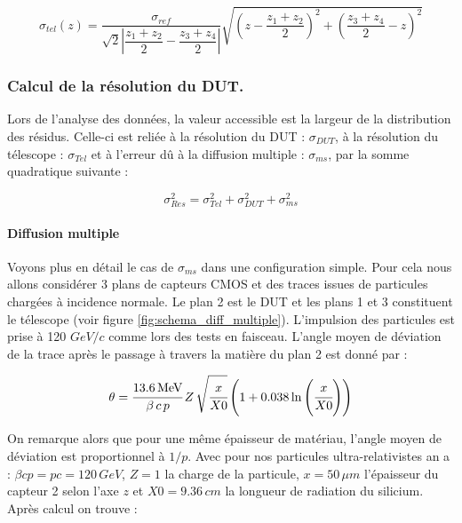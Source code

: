   \begin{equation}
   \sigma_{tel}(z) = \dfrac{\sigma_{ref} }{ \sqrt{2} \left| \dfrac{z_1+z_2}{2} - \dfrac{z_3+z_4}{2} \right| } \sqrt{ \left( z-\dfrac{z_1+z_2}{2} \right)^2 + \left( \dfrac{z_3+z_4}{2} -z \right)^2  }
  \label{reso_tel_4_plans}
  \end{equation}

  
  \subsubsection{Calcul de la résolution du DUT.}

  Lors de l'analyse des donn\'ees, la valeur accessible est la largeur de la distribution des r\'esidus. Celle-ci est reli\'ee \`a la r\'esolution du DUT : $\sigma_{DUT}$, \`a la r\'esolution du t\'elescope : $\sigma_{Tel}$ et \`a l'erreur d\^u \`a la diffusion multiple : $\sigma_{ms}$, par la somme quadratique suivante :
  
  \begin{equation}
   \sigma_{Res}^2 = \sigma_{Tel}^2 + \sigma_{DUT}^2 + \sigma_{ms}^2
   \label{eq:resolution}
  \end{equation}
  
  \paragraph{Diffusion multiple}
  
  Voyons plus en d\'etail le cas de $\sigma_{ms}$ dans une configuration simple. Pour cela nous allons consid\'erer 3 plans de capteurs CMOS et des traces issues de particules charg\'ees \`a incidence normale. Le plan 2 est le DUT et les plans 1 et 3 constituent le t\'elescope (voir figure \ref{fig:schema_diff_multiple}). L'impulsion des particules est prise \`a 120 $GeV/c$ comme lors des tests en faisceau. L'angle moyen de d\'eviation de la trace apr\`es le passage \`a travers la mati\`ere du plan 2 est donn\'e par :
  
  \begin{equation}
   \theta = \cfrac{13.6 \, \text{MeV}}{\beta \, c \, p} \, Z \, \sqrt{\cfrac{x}{X0}} \left( 1+0.038 \ln \left(\cfrac{x}{X0} \right) \right) 
  \end{equation}

  On remarque alors que pour une m\^eme \'epaisseur de mat\'eriau, l'angle moyen de d\'eviation est proportionnel \`a $1/p$.
  Avec pour nos particules ultra-relativistes an a : $\beta c p = pc = 120 \, GeV$, $Z=1$ la charge de la particule, $x = 50 \, \mu m$ l'\'epaisseur du capteur 2 selon l'axe $z$ et $X0 = 9.36 \, cm$ la longueur de radiation du silicium. Apr\`es calcul on trouve :
  

